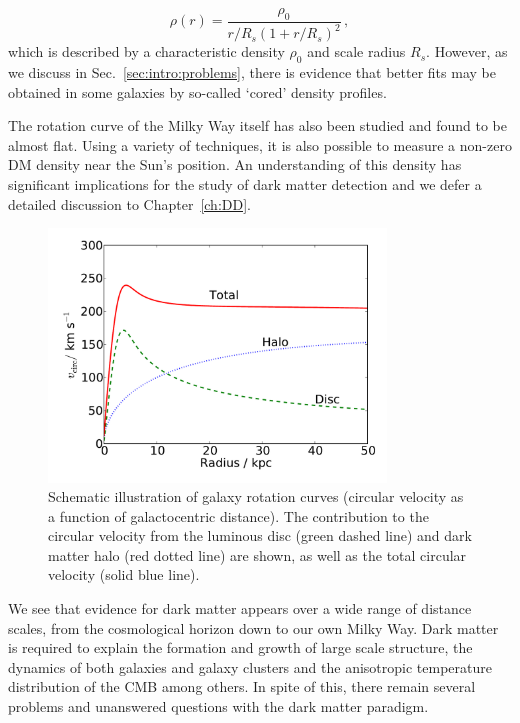 \begin{equation}
\label{eq:intro:NFW}
\rho(r) = \frac{\rho_0}{r/R_s(1 + r/R_s)^2}\,,
\end{equation}
which is described by a characteristic density $\rho_0$ and scale radius $R_s$. However, as we discuss in Sec.~\ref{sec:intro:problems}, there is evidence that better fits may be obtained in some galaxies by so-called `cored' density profiles.

The rotation curve of the Milky Way itself has also been studied \cite{Deason:2012,Lopez-Corredoira:2014,Bhattacharjee:2014} and found to be almost flat. Using a variety of techniques, it is also possible to measure a non-zero DM density near the Sun's position. An understanding of this density has significant implications for the study of dark matter detection and we defer a detailed discussion to Chapter~\ref{ch:DD}.

\begin{figure}[h]

  \centering
  \includegraphics[width=0.8\textwidth]{RotationCurve.pdf}
  \caption[Schematic illustration of galaxy rotation curves]{Schematic illustration of galaxy rotation curves (circular velocity as a function of galactocentric distance). The contribution to the circular velocity from the luminous disc (green dashed line) and dark matter halo (red dotted line) are shown, as well as the total circular velocity (solid blue line). }
  \label{fig:intro:RotationCurves}
\end{figure}

We see that evidence for dark matter appears over a wide range of distance scales, from the cosmological horizon down to our own Milky Way. Dark matter is required to explain the formation and growth of large scale structure, the dynamics of both galaxies and galaxy clusters and the anisotropic temperature distribution of the CMB among others. In spite of this, there remain several problems and unanswered questions with the dark matter paradigm.


